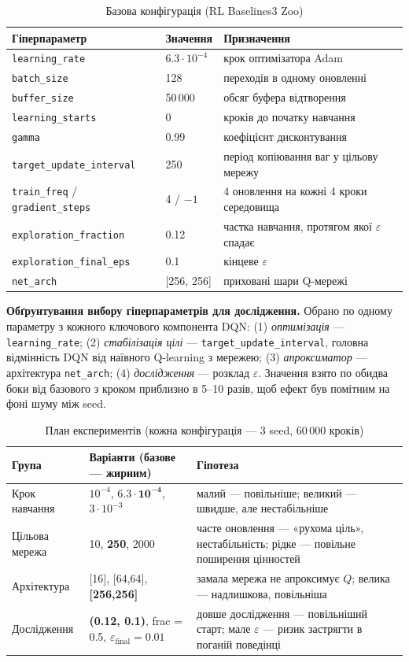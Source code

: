 \documentclass[11pt,a4paper]{article}
\newcommand{\code}[1]{\texttt{#1}}
\begin{document}
\begin{table}[H]\centering\small
\begin{tabular}{lll}\toprule
Гіперпараметр & Значення & Призначення \\ \midrule
\code{learning\_rate} & $6.3\cdot10^{-4}$ & крок оптимізатора Adam \\
\code{batch\_size} & 128 & переходів в одному оновленні \\
\code{buffer\_size} & 50\,000 & обсяг буфера відтворення \\
\code{learning\_starts} & 0 & кроків до початку навчання \\
\code{gamma} & 0.99 & коефіцієнт дисконтування \\
\code{target\_update\_interval} & 250 & період копіювання ваг у цільову мережу \\
\code{train\_freq} / \code{gradient\_steps} & 4 / $-1$ & 4 оновлення на кожні 4 кроки середовища \\
\code{exploration\_fraction} & 0.12 & частка навчання, протягом якої $\varepsilon$ спадає \\
\code{exploration\_final\_eps} & 0.1 & кінцеве $\varepsilon$ \\
\code{net\_arch} & [256, 256] & приховані шари Q-мережі \\ \bottomrule
\end{tabular}
\caption{Базова конфігурація (RL Baselines3 Zoo)}
\end{table}

\textbf{Обґрунтування вибору гіперпараметрів для дослідження.} Обрано по одному параметру з кожного ключового компонента DQN: (1) \emph{оптимізація} — \code{learning\_rate}; (2) \emph{стабілізація цілі} — \code{target\_update\_interval}, головна відмінність DQN від наївного Q-learning з мережею; (3) \emph{апроксиматор} — архітектура \code{net\_arch}; (4) \emph{дослідження} — розклад $\varepsilon$. Значення взято по обидва боки від базового з кроком приблизно в 5–10 разів, щоб ефект був помітним на фоні шуму між seed.

\begin{table}[H]\centering\small
\begin{tabular}{p{3cm}p{4.8cm}p{7.6cm}}\toprule
Група & Варіанти (базове — жирним) & Гіпотеза \\ \midrule
Крок навчання & $10^{-4}$, $\mathbf{6.3\cdot10^{-4}}$, $3\cdot10^{-3}$ & малий — повільніше; великий — швидше, але нестабільніше \\
Цільова мережа & 10, \textbf{250}, 2000 & часте оновлення — «рухома ціль», нестабільність; рідке — повільне поширення цінностей \\
Архітектура & [16], [64,64], \textbf{[256,256]} & замала мережа не апроксимує $Q$; велика — надлишкова, повільніша \\
Дослідження & \textbf{(0.12, 0.1)}, frac = 0.5, $\varepsilon_{\text{final}}=0.01$ & довше дослідження — повільніший старт; мале $\varepsilon$ — ризик застрягти в поганій поведінці \\ \bottomrule
\end{tabular}
\caption{План експериментів (кожна конфігурація — 3 seed, 60\,000 кроків)}
\end{table}
\end{document}
